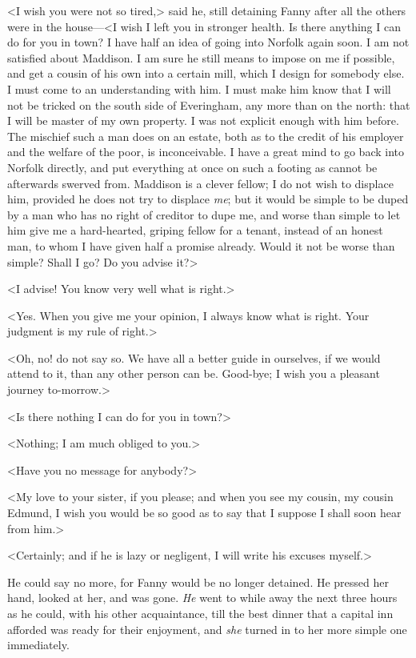 <I wish you were not so tired,> said he, still detaining Fanny after all the others were in the house—<I wish I left you in stronger health. Is there anything I can do for you in town? I have half an idea of going into Norfolk again soon. I am not satisfied about Maddison. I am sure he still means to impose on me if possible, and get a cousin of his own into a certain mill, which I design for somebody else. I must come to an understanding with him. I must make him know that I will not be tricked on the south side of Everingham, any more than on the north: that I will be master of my own property. I was not explicit enough with him before. The mischief such a man does on an estate, both as to the credit of his employer and the welfare of the poor, is inconceivable. I have a great mind to go back into Norfolk directly, and put everything at once on such a footing as cannot be afterwards swerved from. Maddison is a clever fellow; I do not wish to displace him, provided he does not try to displace \textit{me}; but it would be simple to be duped by a man who has no right of creditor to dupe me, and worse than simple to let him give me a hard-hearted, griping fellow for a tenant, instead of an honest man, to whom I have given half a promise already. Would it not be worse than simple? Shall I go? Do you advise it?>

<I advise! You know very well what is right.>

<Yes. When you give me your opinion, I always know what is right. Your judgment is my rule of right.>

<Oh, no! do not say so. We have all a better guide in ourselves, if we would attend to it, than any other person can be. Good-bye; I wish you a pleasant journey to-morrow.>

<Is there nothing I can do for you in town?>

<Nothing; I am much obliged to you.>

<Have you no message for anybody?>

<My love to your sister, if you please; and when you see my cousin, my cousin Edmund, I wish you would be so good as to say that I suppose I shall soon hear from him.>

<Certainly; and if he is lazy or negligent, I will write his excuses myself.>

He could say no more, for Fanny would be no longer detained. He pressed her hand, looked at her, and was gone. \textit{He}  went to while away the next three hours as he could, with his other acquaintance, till the best dinner that a capital inn afforded was ready for their enjoyment, and \textit{she}  turned in to her more simple one immediately.

